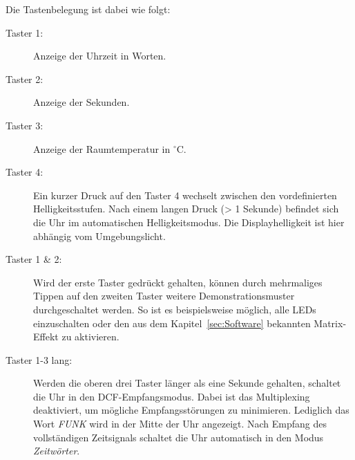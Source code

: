 \begin{multicols}{2}
Die Tastenbelegung ist dabei wie folgt:
\begin{description}
    \item[Taster 1:] Anzeige der Uhrzeit in Worten.
    \item[Taster 2:] Anzeige der Sekunden.
    \item[Taster 3:] Anzeige der Raumtemperatur in $^\circ$C.
    \item[Taster 4:] Ein kurzer Druck auf den Taster 4 wechselt zwischen den vordefinierten Helligkeitsstufen.
    Nach einem langen Druck (> 1 Sekunde) befindet sich die Uhr im automatischen Helligkeitsmodus.
    Die Displayhelligkeit ist hier abhängig vom Umgebungslicht.
    \item[Taster 1 \& 2:] Wird der erste Taster gedrückt gehalten, können durch mehrmaliges Tippen auf den zweiten Taster weitere Demonstrationsmuster durchgeschaltet werden.
    So ist es beispielsweise möglich, alle LEDs einzuschalten oder den aus dem Kapitel~\ref{sec:Software} bekannten Matrix-Effekt zu aktivieren.
    \item[Taster 1-3 lang:] Werden die oberen drei Taster länger als eine Sekunde gehalten, schaltet die Uhr in den DCF-Empfangsmodus.
    Dabei ist das Multiplexing deaktiviert, um mögliche Empfangsstörungen zu minimieren. Lediglich das Wort \emph{FUNK} wird in der Mitte der Uhr angezeigt.
    Nach Empfang des vollständigen Zeitsignals schaltet die Uhr automatisch in den Modus \emph{Zeitwörter}.
\end{description}


\end{multicols}
